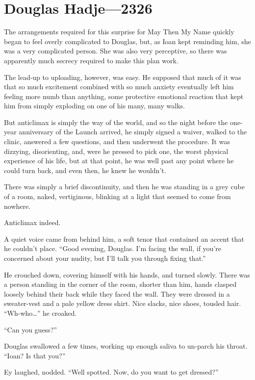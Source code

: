 \hypertarget{douglas-hadje-2326}{%
\chapter{Douglas Hadje—2326}\label{douglas-hadje-2326}}

The arrangements required for this surprise for May Then My Name quickly began to feel overly complicated to Douglas, but, as Ioan kept reminding him, she was a very complicated person. She was also very perceptive, so there was apparently much secrecy required to make this plan work.

The lead-up to uploading, however, was easy. He supposed that much of it was that so much excitement combined with so much anxiety eventually left him feeling more numb than anything, some protective emotional reaction that kept him from simply exploding on one of his many, many walks.

But anticlimax is simply the way of the world, and so the night before the one-year anniversary of the Launch arrived, he simply signed a waiver, walked to the clinic, answered a few questions, and then underwent the procedure. It was dizzying, disorienting, and, were he pressed to pick one, the worst physical experience of his life, but at that point, he was well past any point where he could turn back, and even then, he knew he wouldn't.

There was simply a brief discontinuity, and then he was standing in a grey cube of a room, naked, vertiginous, blinking at a light that seemed to come from nowhere.

Anticlimax indeed.

A quiet voice came from behind him, a soft tenor that contained an accent that he couldn't place. ``Good evening, Douglas. I'm facing the wall, if you're concerned about your nudity, but I'll talk you through fixing that.''

He crouched down, covering himself with his hands, and turned slowly. There was a person standing in the corner of the room, shorter than him, hands clasped loosely behind their back while they faced the wall. They were dressed in a sweater-vest and a pale yellow dress shirt. Nice slacks, nice shoes, tousled hair. ``Wh-who\ldots{}'' he croaked.

``Can you guess?''

Douglas swallowed a few times, working up enough saliva to un-parch his throat. ``Ioan? Is that you?''

Ey laughed, nodded. ``Well spotted. Now, do you want to get dressed?''


